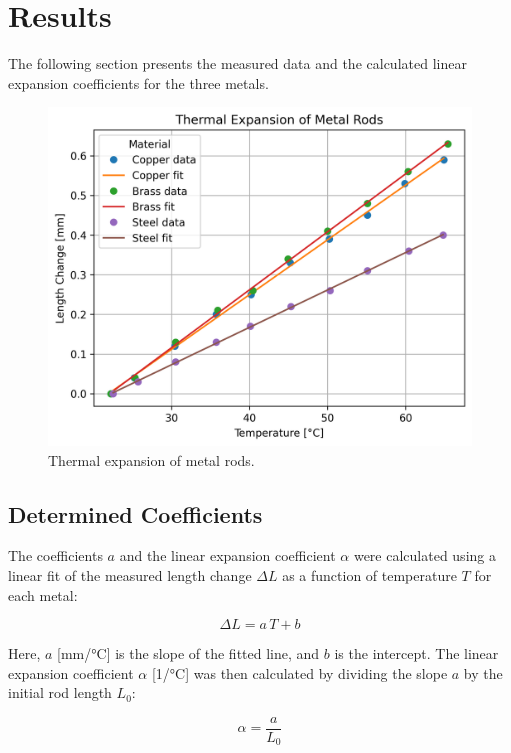 \section{Results}

The following section presents the measured data and the calculated linear expansion coefficients for the three metals.

\begin{figure}[h]
    \centering
    \includegraphics[width=1\textwidth]{figures/expansion_plot.png}
    \caption{Thermal expansion of metal rods.}
    \label{fig:expansion_plot}
\end{figure}

\subsection*{Determined Coefficients}

The coefficients $a$ and the linear expansion coefficient $\alpha$ were calculated using a linear fit of the measured length change $\Delta L$ as a function of temperature $T$ for each metal:

\begin{equation}
    \Delta L = a \, T + b
\end{equation}

Here, $a$ [mm/°C] is the slope of the fitted line, and $b$ is the intercept. The linear expansion coefficient $\alpha$ [1/°C] was then calculated by dividing the slope $a$ by the initial rod length $L_0$:

\begin{equation}
    \alpha = \frac{a}{L_0}
\end{equation}

